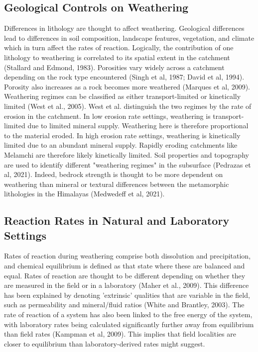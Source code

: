 \subsection{Geological Controls on Weathering}

Differences in lithology are thought to affect weathering. Geological differences lead to differences in soil composition, landscape features, vegetation, and climate which in turn affect the rates of reaction. Logically, the contribution of one lithology to weathering is correlated to its spatial extent in the catchment (Stallard and Edmond, 1983). Porosities vary widely across a catchment depending on the rock type encountered (Singh et al, 1987; David et al, 1994). Porosity also increases as a rock becomes more weathered (Marques et al, 2009). Weathering regimes can be classified as either transport-limited or kinetically limited (West et al., 2005). West et al. distinguish the two regimes by the rate of erosion in the catchment. In low erosion rate settings, weathering is transport-limited due to limited mineral supply. Weathering here is therefore proportional to the material eroded. In high erosion rate settings, weathering is kinetically limited due to an abundant mineral supply. Rapidly eroding catchments like Melamchi are therefore likely kinetically limited. Soil properties and topography are used to identify different "weathering regimes" in the subsurface (Pedrazas et al, 2021). Indeed, bedrock strength is thought to be more dependent on weathering than mineral or textural differences between the metamorphic lithologies in the Himalayas (Medwedeff et al, 2021).



\subsection{Reaction Rates in Natural and Laboratory Settings}

Rates of reaction during weathering comprise both dissolution and precipitation, and chemical equilibrium is defined as that state where these are balanced and equal. Rates of reaction are thought to be different depending on whether they are measured in the field or in a laboratory (Maher et al., 2009). This difference has been explained by denoting 'extrinsic' qualities that are variable in the field, such as permeability and mineral/fluid ratios (White and Brantley, 2003). The rate of reaction of a system has also been linked to the free energy of the system, with laboratory rates being calculated significantly further away from equilibrium than field rates (Kampman et al, 2009). This implies that field localities are closer to equilibrium than laboratory-derived rates might suggest. 



